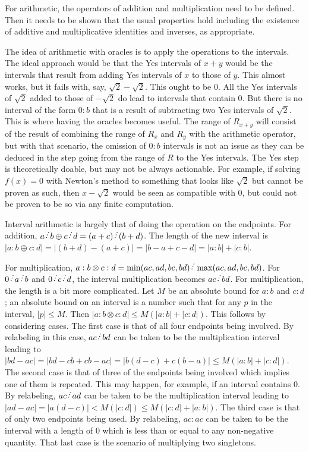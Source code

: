 \documentclass[12pt]{article}
\begin{document}
For arithmetic, the operators of addition and multiplication need to be defined. Then it needs to be shown that the usual properties hold including the existence of additive and multiplicative identities and inverses, as appropriate. 

The idea of arithmetic with oracles is to apply the operations to the intervals. The ideal approach would be that the Yes intervals of $x+y$ would be the intervals that result from adding Yes intervals of $x$ to those of $y$. This almost works, but it fails with, say, $\sqrt{2} - \sqrt{2}$. This ought to be 0. All the Yes intervals of $\sqrt{2}$ added to those of $-\sqrt{2}$ do lead to intervals that contain 0. But there is no interval of the form $0:b$ that is a result of subtracting two Yes intervals of $\sqrt{2}$. This is where having the oracles becomes useful. The range of $R_{x+y}$ will consist of the result of combining the range of $R_x$ and $R_y$ with the arithmetic operator, but with that scenario, the omission of $0:b$ intervals is not an issue as they can be deduced in the step going from the range of $R$ to the Yes intervals. The Yes step is theoretically doable, but may not be always actionable. For example, if solving $f(x)=0$ with Newton's method to something that looks like $\sqrt{2}$ but cannot be proven as such, then $x - \sqrt{2}$ would be seen as compatible with 0, but could not be proven to be so via any finite computation. 

Interval arithmetic is largely that of doing the operation on the endpoints. For addition, $a \lte b \oplus c \lte d = (a+c) \lte (b+d)$. The length of the new interval is $|a:b \oplus c:d| = |(b+d) - (a + c)| = |b-a+ c-d| = |a:b|+|c:b|$.

For multiplication, $a:b \otimes c:d = \min(ac, ad, bc, bd)\lte \max(ac, ad, bc, bd)$. For $0 \lte a \lte b$ and $0 \lte c \lte d$, the interval multiplication becomes $ac \lte bd$. For multiplication, the length is a bit more complicated. Let $M$ be an absolute bound for $a:b$ and $c:d$; an absolute bound on an interval is a number such that for any $p$ in the interval, $|p| \leq M$. Then $|a:b \otimes c:d| \leq M(|a:b| + |c:d|)$. This follows by considering cases. The first case is that of all four endpoints being involved. By relabeling in this case,  $ac \lte bd$ can be taken to be the multiplication interval leading to $|bd - ac| = |bd - cb + cb - ac| = |b(d-c) + c (b-a)| \leq M (|a:b| + |c:d|)$. The second case is that of three of the endpoints being involved which implies one of them is repeated. This may happen, for example, if an interval contains 0. By relabeling, $ac \lte ad$ can be taken to be the multiplication interval leading to $|ad - ac| = |a(d-c)| < M (|c:d|) \leq M (|c:d| + |a:b|)$. The third case is that of only two endpoints being used. By relabeling, $ac:ac$ can be taken to be the interval with a length of 0 which is less than or equal to any non-negative quantity.  That last case is the scenario of multiplying two singletons. 
\end{document}
